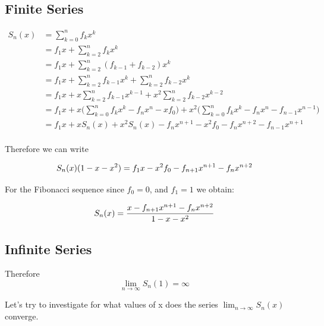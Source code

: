 \documentclass[a4paper]{article}
\begin{document}
\subsection{Finite Series}\label{fib:subsec:finite-series}
\begin{equation}
\begin{split}
S_{n}(x) & = \sum_{k=0}^{n} f_k x^k \\
 & = f_1 x + \sum_{k=2}^{n} f_k x^k \\
 & = f_1 x + \sum_{k=2}^{n} (f_{k-1} + f_{k-2}) x^k \\
 & = f_1 x + \sum_{k=2}^{n} f_{k-1} x^k + \sum_{k=2}^{n} f_{k-2} x^k \\
  & = f_1 x + x \sum_{k=2}^{n} f_{k-1} x^{k-1} + x^2 \sum_{k=2}^{n} f_{k-2} x^{k-2} \\
  & = f_1 x + x \Big( \sum_{k=0}^{n} f_{k} x^{k} - f_n x^n  - x f_0 \Big) + x^2 \Big( \sum_{k=0}^{n} f_{k} x^{k} - f_n x^n - f_{n-1} x^{n-1} \Big) \\
  & = f_1 x + x S_{n}(x) + x^2 S_{n}(x) - f_{n}x^{n+1} - x^2 f_0 - f_n x^{n+2} - f_{n-1} x^{n+1}\\
\end{split}\label{fib:eq:equation11}
\end{equation}

Therefore we can write

\begin{equation}
S_{n}(x) (1 - x -x^2 ) = f_1 x - x^2 f_0 - f_{n+1}x^{n+1} - f_n x^{n+2}\\
\label{fib:eq:equation12}
\end{equation}

For the Fibonacci sequence since $f_0 = 0$, and  $f_1 = 1$ we obtain:

\begin{equation}
S_{n}(x) = \frac{x - f_{n+1}x^{n+1} - f_n x^{n+2}}{1 - x -x^2 }  \\
\label{fib:eq:equation13}
\end{equation}


\subsection{Infinite Series}\label{fib:subsec:infinite-series}
Therefore
\begin{equation}
\lim_{n \to \infty} S_n(1) = \infty
\label{fib:eq:equation14}
\end{equation}

Let's try to investigate for what values of x does the series $\lim_{n \to \infty} S_n(x)$ converge.
\end{document}
